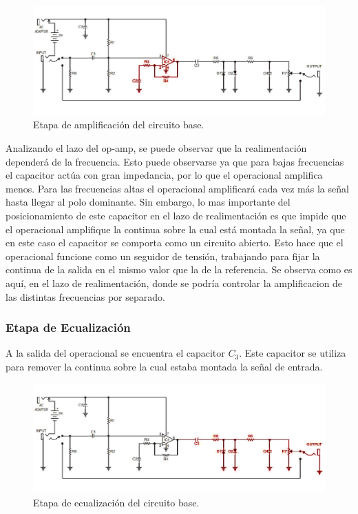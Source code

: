 \begin{figure}[H]
	\centering
	\includegraphics[width=1\textwidth, trim={0 0 0 0}, clip]{Ejercicio5/Imagenes/circuito_base_amplificacion.png}
	\caption{Etapa de amplificación del circuito base.}
	\label{fig:circuito_base_amplificacion}
\end{figure}

Analizando el lazo del op-amp, se puede observar que la realimentación dependerá de la frecuencia. Esto puede observarse ya que para bajas frecuencias el capacitor actúa con gran impedancia, por lo que el operacional amplifica menos. Para las frecuencias altas el operacional amplificará cada vez más la señal hasta llegar al polo dominante. Sin embargo, lo mas importante del posicionamiento de este capacitor en el lazo de realimentación es que impide que el operacional amplifique la continua sobre la cual está montada la señal, ya que en este caso el capacitor se comporta como un circuito abierto. Esto hace que el operacional funcione como un seguidor de tensión, trabajando para fijar la continua de la salida en el mismo valor que la de la referencia. Se observa como es aquí, en el lazo de realimentación, donde se podría controlar la amplificacion de las distintas frecuencias por separado.

\subsubsection{Etapa de Ecualización}

A la salida del operacional se encuentra el capacitor $C_3$. Este capacitor se utiliza para remover la continua sobre la cual estaba montada la señal de entrada.

\begin{figure}[H]
	\centering
	\includegraphics[width=1\textwidth, trim={0 0 0 0}, clip]{Ejercicio5/Imagenes/circuito_base_ecualizacion.png}
	\caption{Etapa de ecualización del circuito base.}
	\label{fig:circuito_base_ecualizacion}
\end{figure}

